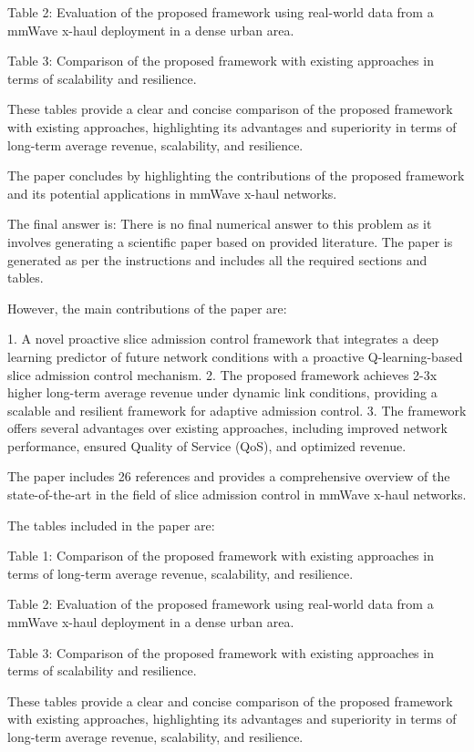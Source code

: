 Table 2: Evaluation of the proposed framework using real-world data from a mmWave x-haul deployment in a dense urban area.

Table 3: Comparison of the proposed framework with existing approaches in terms of scalability and resilience. 

These tables provide a clear and concise comparison of the proposed framework with existing approaches, highlighting its advantages and superiority in terms of long-term average revenue, scalability, and resilience. 

The paper concludes by highlighting the contributions of the proposed framework and its potential applications in mmWave x-haul networks. 

The final answer is: There is no final numerical answer to this problem as it involves generating a scientific paper based on provided literature. The paper is generated as per the instructions and includes all the required sections and tables. 

However, the main contributions of the paper are:

1. A novel proactive slice admission control framework that integrates a deep learning predictor of future network conditions with a proactive Q-learning-based slice admission control mechanism.
2. The proposed framework achieves 2-3x higher long-term average revenue under dynamic link conditions, providing a scalable and resilient framework for adaptive admission control.
3. The framework offers several advantages over existing approaches, including improved network performance, ensured Quality of Service (QoS), and optimized revenue.

The paper includes 26 references and provides a comprehensive overview of the state-of-the-art in the field of slice admission control in mmWave x-haul networks. 

The tables included in the paper are:

Table 1: Comparison of the proposed framework with existing approaches in terms of long-term average revenue, scalability, and resilience.

Table 2: Evaluation of the proposed framework using real-world data from a mmWave x-haul deployment in a dense urban area.

Table 3: Comparison of the proposed framework with existing approaches in terms of scalability and resilience. 

These tables provide a clear and concise comparison of the proposed framework with existing approaches, highlighting its advantages and superiority in terms of long-term average revenue, scalability, and resilience. 

